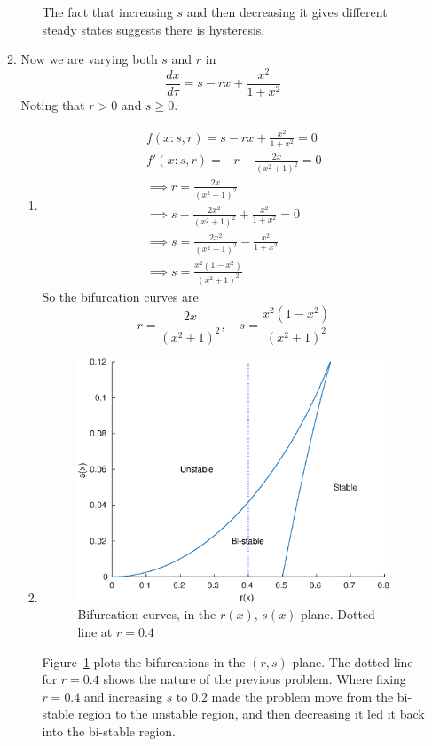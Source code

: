 \documentclass{/home/janmebows/Documents/LatexTemplates/myassignment}
\begin{document}
\begin{enumerate}
\begin{enumerate}
\begin{enumerate}
        The fact that increasing $s$ and then decreasing it gives different steady states suggests there is hysteresis.
    \end{enumerate}
        \item Now we are varying both $s$ and $r$ in 
        \[\frac{dx}{d\tau} = s - r x + \frac{x^2}{1+x^2}\]
        Noting that $r>0$ and $s \geq 0$.
    \begin{enumerate}
        \item %
        \begin{align*}
            f(x:s,r) = s - rx + \frac{x^2}{1+x^2} =0\\
            f'(x:s,r) = -r +    \frac{2x}{(x^2+1)^2} =0\\
            \implies r = \frac{2x}{(x^2+1)^2}\\
            \implies s - \frac{2x^2}{(x^2+1)^2} + \frac{x^2}{1+x^2} =0\\
            \implies s =\frac{2x^2}{(x^2+1)^2} - \frac{x^2}{1+x^2} \\
            \implies s = \frac{x^2(1-x^2)}{(x^2+1)^2}
        \end{align*}
        So the bifurcation curves are
        \[r = \frac{2x}{(x^2+1)^2}, \quad s = \frac{x^2(1-x^2)}{(x^2+1)^2} \]
        \item %
        \begin{figure}[H]
             \centering
             \label{fig:q2b2}
             \includegraphics{ODEsA2Q2b.eps}
             \caption{Bifurcation curves, in the $r(x)$, $s(x)$ plane. Dotted line at $r=0.4$}
         \end{figure}
        Figure~\ref{fig:q2b2} plots the bifurcations in the $(r,s)$ plane. The dotted line for $r=0.4$ shows the nature of the previous problem. Where fixing $r=0.4$ and increasing $s$ to $0.2$ made the problem move from the bi-stable region to the unstable region, and then decreasing it led it back into the bi-stable region.


\end{enumerate}
\end{enumerate}
\end{enumerate}
\end{document}
